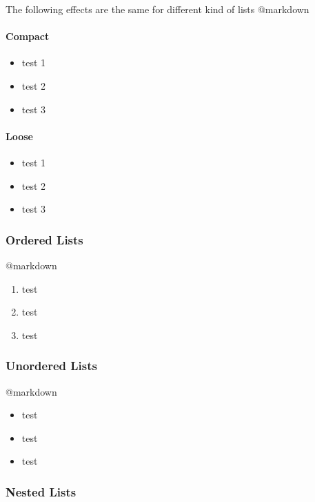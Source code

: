 \documentclass[]{article}
\providecommand{\tightlist}{%
  \setlength{\itemsep}{0pt}\setlength{\parskip}{0pt}}
\let\oldparagraph\paragraph
\renewcommand{\paragraph}[1]{\oldparagraph{#1}\mbox{}}
\begin{document}
The following effects are the same for different kind of lists @markdown

\paragraph{Compact}\label{compact}

\begin{itemize}
\tightlist
\item
  test 1
\item
  test 2
\item
  test 3
\end{itemize}

\paragraph{Loose}\label{loose}

\begin{itemize}
\item
  test 1
\item
  test 2
\item
  test 3
\end{itemize}

\subsubsection{Ordered Lists}\label{ordered-lists}

@markdown

\begin{enumerate}
\def\labelenumi{\arabic{enumi}.}
\tightlist
\item
  test
\item
  test
\item
  test
\end{enumerate}

\subsubsection{Unordered Lists}\label{unordered-lists}

@markdown

\begin{itemize}
\tightlist
\item
  test
\item
  test
\item
  test
\end{itemize}

\subsubsection{Nested Lists}\label{nested-lists}
\end{document}
